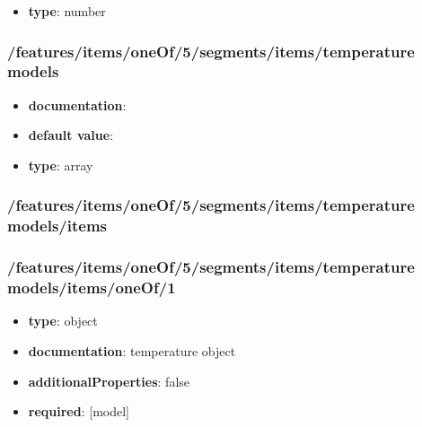 \begin{itemize}\item {\bf type}: number
\end{itemize}\subsubsection{/features/items/oneOf/5/segments/items/temperature models}
\begin{itemize}\item {\bf documentation}: 
\item {\bf default value}: 
\item {\bf type}: array
\end{itemize}\subsubsection{/features/items/oneOf/5/segments/items/temperature models/items}

\subsubsection{/features/items/oneOf/5/segments/items/temperature models/items/oneOf/1}
\begin{itemize}\item {\bf type}: object
\item {\bf documentation}: temperature object
\item {\bf additionalProperties}: false
\item {\bf required}: [model]\end{itemize}
